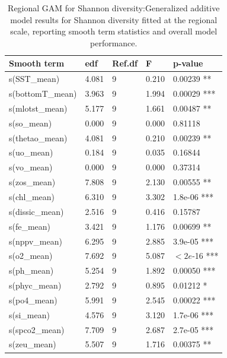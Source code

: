 \documentclass[a4paper,fleqn]{cas-sc}
\begin{document}
\begin{table}[width=.9\linewidth,cols=5,pos=h]
\caption{Regional GAM for Shannon diversity:Generalized additive model results for Shannon diversity fitted at the regional scale, reporting smooth term statistics and overall model performance.}
\small
\begin{tabular*}{\tblwidth}{@{} LLLLL @{}}
\toprule
\textbf{Smooth term} & \textbf{edf} & \textbf{Ref.df} & \textbf{F} & \textbf{p-value} \\
\midrule
s(SST\_mean)      & 4.081 & 9 & 0.210 & 0.00239 ** \\
s(bottomT\_mean) & 3.963 & 9 & 1.994 & 0.00029 *** \\
s(mlotst\_mean)   & 5.177 & 9 & 1.661 & 0.00487 ** \\
s(so\_mean)       & 0.000 & 9 & 0.000 & 0.81118 \\
s(thetao\_mean)   & 4.081 & 9 & 0.210 & 0.00239 ** \\
s(uo\_mean)       & 0.184 & 9 & 0.035 & 0.16844 \\
s(vo\_mean)       & 0.000 & 9 & 0.000 & 0.37314 \\
s(zos\_mean)      & 7.808 & 9 & 2.130 & 0.00555 ** \\
s(chl\_mean)      & 6.310 & 9 & 3.302 & 1.8e-06 *** \\
s(dissic\_mean)   & 2.516 & 9 & 0.416 & 0.15787 \\
s(fe\_mean)       & 3.421 & 9 & 1.176 & 0.00699 ** \\
s(nppv\_mean)     & 6.295 & 9 & 2.885 & 3.9e-05 *** \\
s(o2\_mean)       & 7.692 & 9 & 5.087 & $< 2e$-16 *** \\
s(ph\_mean)       & 5.254 & 9 & 1.892 & 0.00050 *** \\
s(phyc\_mean)     & 2.792 & 9 & 0.895 & 0.01212 * \\
s(po4\_mean)      & 5.991 & 9 & 2.545 & 0.00022 *** \\
s(si\_mean)       & 4.576 & 9 & 3.120 & 1.7e-06 *** \\
s(spco2\_mean)    & 7.709 & 9 & 2.687 & 2.7e-05 *** \\
s(zeu\_mean)      & 5.507 & 9 & 1.716 & 0.00375 ** \\
\bottomrule
\end{tabular*}
\label{tab:13}
\end{table}
\FloatBarrier
\end{document}
